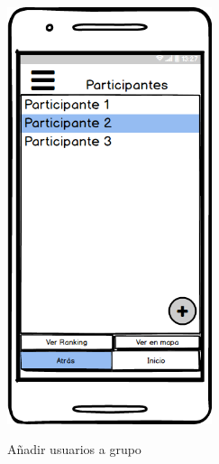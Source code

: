\begin{figure}[htbp]
\begin{minipage}[b]{0.5\linewidth}
\end{minipage}
\hspace{0.5cm} %
\begin{minipage}[b]{0.5\linewidth}
\centering
\includegraphics[width=6cm]{maqueta/Ver-Miembros-grupo.png}
 \label{figura2}
\caption{Añadir usuarios a grupo}

\end{minipage}
\end{figure}
	
	
	
	
	
	
	
	
	
	
	
	
	
	
	
	
	
